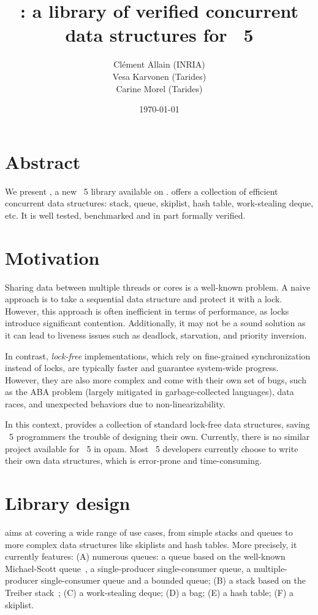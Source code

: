 \documentclass[a4paper, 11pt]{article}
\title{\Saturn: a library of verified concurrent data structures for \OCaml~5}
\date{\today}
\author{
  Clément Allain (INRIA) \\
  Vesa Karvonen (Tarides) \\
  Carine Morel (Tarides)
}
\begin{document}
\maketitle

\section{Abstract}

We present \Saturn, a new \OCaml~5 library available on \opam.
\Saturn offers a collection of efficient concurrent data structures: stack, queue, skiplist, hash table, work-stealing deque, etc.
It is well tested, benchmarked and in part formally verified.

\section{Motivation}
Sharing data between multiple threads or cores is a well-known problem. A naive approach is to take a sequential data structure and protect it with a lock. However, this approach is often inefficient in terms of performance, as locks introduce significant contention. Additionally, it may not be a sound solution as it can lead to liveness issues such as deadlock, starvation, and priority inversion.

In contrast, \emph{lock-free} implementations, which rely on fine-grained synchronization instead of locks, are typically faster and guarantee system-wide progress. However, they are also more complex and come with their own set of bugs, such as the ABA problem (largely mitigated in garbage-collected languages), data races, and unexpected behaviors due to non-linearizability.

In this context, \Saturn provides a collection of standard lock-free data structures, saving \OCaml~5 programmers the trouble of designing their own. Currently, there is no similar project available for \OCaml~5 in opam. Most \OCaml~5 developers currently choose to write their own data structures, which is error-prone and time-consuming.

\section{Library design}

\Saturn aims at covering a wide range of use cases, from simple stacks and queues to more complex data structures like skiplists and hash tables.
More precisely, it currently features:
(A) numerous queues: a queue based on the well-known Michael-Scott queue~\cite{michael1996simple}, a single-producer single-consumer queue, a multiple-producer single-consumer queue and a bounded queue;
(B) a stack based on the Treiber stack~\cite{treiber1986systems};
(C) a work-stealing deque;
(D) a bag;
(E) a hash table;
(F) a skiplist.
\end{document}
